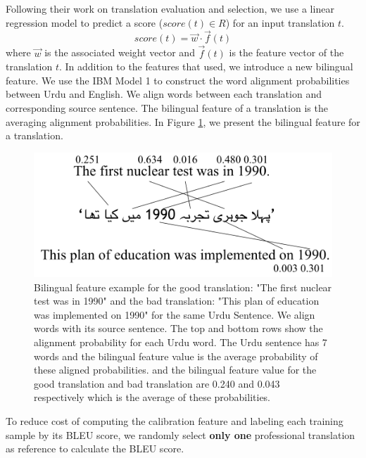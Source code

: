 \documentclass[11pt,letterpaper]{article}
\begin{document}
Following their work on translation evaluation and selection, we use a linear regression model to predict a score  ($ score(t) \in R$) for an input translation $t$.
\[ score(t) = \vec{w}  \cdot \vec f(t) \]
  where $\vec{w}$ is the associated weight vector and $\vec f(t)$ is the feature vector of the translation $t$. 
In addition to the features that \cite{zaidan-callisonburch:2011:ACL-HLT2011a} used, we introduce a new bilingual feature. We use the IBM Model 1 to construct the word alignment probabilities between Urdu and English. We align words between each translation and corresponding source sentence. The bilingual feature of a translation is the averaging alignment probabilities. In Figure \ref{biexample1}, we present the bilingual feature for a translation.

\begin{figure}[h!]
  \centering
  \includegraphics[width=\linewidth]{bilingualexample/example.png}
  \caption{Bilingual feature example for the good translation: "The first nuclear test was in 1990" and the bad translation: "This plan of education was implemented on 1990" for the same Urdu Sentence. We align words with its source sentence. The top and bottom rows show the alignment probability for each Urdu word. The Urdu sentence has 7 words and the bilingual feature value is the average probability of these aligned probabilities. and the bilingual feature value for the good translation and bad translation are 0.240 and 0.043 respectively which is the average of these probabilities.
}
    \label{biexample1}
\end{figure}
To reduce cost of computing the calibration feature and labeling each training sample by its BLEU score, we  randomly select \textbf{only one} professional translation as reference to calculate the BLEU score.
\end{document}
